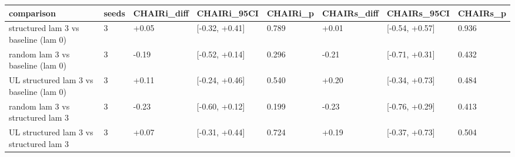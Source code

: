 \begin{tabular}{llllllll}
\hline
comparison & seeds & CHAIRi\_diff & CHAIRi\_95CI & CHAIRi\_p & CHAIRs\_diff & CHAIRs\_95CI & CHAIRs\_p \\
\hline
structured lam 3 vs baseline (lam 0) & 3 & +0.05 & [-0.32, +0.41] & 0.789 & +0.01 & [-0.54, +0.57] & 0.936 \\
random lam 3 vs baseline (lam 0) & 3 & -0.19 & [-0.52, +0.14] & 0.296 & -0.21 & [-0.71, +0.31] & 0.432 \\
UL structured lam 3 vs baseline (lam 0) & 3 & +0.11 & [-0.24, +0.46] & 0.540 & +0.20 & [-0.34, +0.73] & 0.484 \\
random lam 3 vs structured lam 3 & 3 & -0.23 & [-0.60, +0.12] & 0.199 & -0.23 & [-0.76, +0.29] & 0.413 \\
UL structured lam 3 vs structured lam 3 & 3 & +0.07 & [-0.31, +0.44] & 0.724 & +0.19 & [-0.37, +0.73] & 0.504 \\
\hline
\end{tabular}
